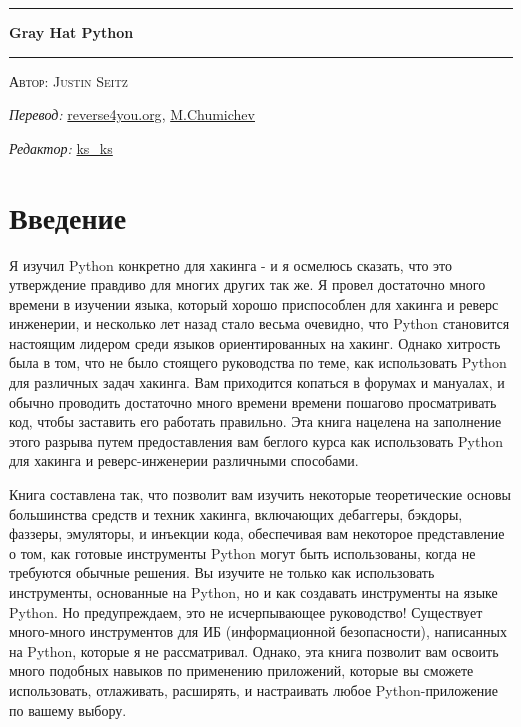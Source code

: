 \documentclass[12pt]{book}
\begin{document}
\begin{titlepage}
\begin{center}
	\hrule\vskip 0.4cm
	\textbf{\huge Gray Hat Python}
	\vskip 0.4cm

	\hrule\vskip 1.5cm
	\textsc{\Large Автор: Justin Seitz}
	\vskip 0.5cm

	\begin{minipage}{0.4\textwidth}
		\begin{flushleft} \large
		\emph{Перевод: }
		\href{http://reverse4you.org}{reverse4you.org}, \href{http://chumichev.blogspot.com/}{M.Chumichev}
		\end{flushleft}
	\end{minipage}
	\begin{minipage}{0.4\textwidth}
		\begin{flushright} \large
		\emph{Редактор:} 
		\href{http://vk.com/woodooshaman}{ks\_ks}
		\end{flushright}
	\end{minipage}
	\vfill
\end{center}
\end{titlepage}

\section*{Введение}

Я изучил Python конкретно для хакинга - и я осмелюсь сказать, что это утверждение правдиво для многих других так же. Я провел достаточно много времени в изучении языка, который хорошо приспособлен для хакинга и реверс инженерии, и несколько лет назад стало весьма очевидно, что Python становится настоящим лидером среди языков ориентированных на хакинг. Однако хитрость была в том, что не было стоящего руководства по теме, как использовать Python для различных задач хакинга. Вам приходится копаться в форумах и мануалах, и обычно проводить достаточно много времени времени пошагово просматривать код, чтобы заставить его работать правильно. Эта книга нацелена на заполнение этого разрыва путем предоставления вам беглого курса как использовать Python для хакинга и реверс-инженерии различными способами.

Книга составлена так, что позволит вам изучить некоторые теоретические основы большинства средств и техник хакинга, включающих дебаггеры, бэкдоры, фаззеры, эмуляторы, и инъекции кода, обеспечивая вам некоторое представление о том, как готовые инструменты Python могут быть использованы, когда не требуются обычные решения. Вы изучите не только как использовать инструменты, основанные на Python, но и как создавать инструменты на языке Python. Но предупреждаем, это не исчерпывающее руководство! Существует много-много инструментов для ИБ (информационной безопасности), написанных на Python, которые я не рассматривал. Однако, эта книга позволит вам освоить много подобных навыков по применению приложений, которые вы сможете использовать, отлаживать, расширять, и настраивать любое Python-приложение по вашему выбору.
\end{document}

